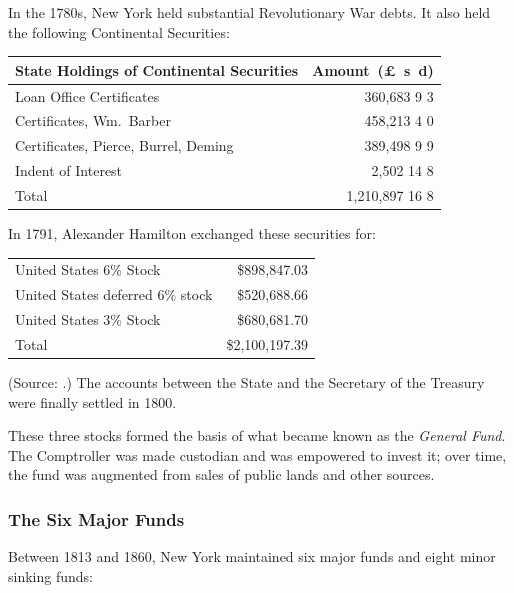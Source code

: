 \documentclass[11pt]{article}
\newcommand{\STRUT}{\rule{0in}{3ex}}
\begin{document}
In the 1780s, New York held substantial Revolutionary War debts.  It also
held the following Continental Securities:

\begin{center}
\begin{tabular}{lr}
State Holdings of Continental Securities & Amount~(£~s~d) \\
\hline
Loan Office Certificates             & 360,683 9 3\STRUT\\
Certificates, Wm.~Barber            & 458,213 4 0\\
Certificates, Pierce, Burrel, Deming & 389,498 9 9\\
Indent of Interest                   & 2,502 14 8 \\
\hline
Total & 1,210,897 16 8\STRUT
\end{tabular}
\end{center}

In 1791, Alexander Hamilton exchanged these securities for:
\begin{center}
\begin{tabular}{lr}
United States 6\% Stock          & \$898,847.03 \\
United States deferred 6\% stock & \$520,688.66 \\
United States 3\% Stock          & \$680,681.70 \\
\hline
Total                            & \$2,100,197.39
\end{tabular}
\end{center}
(Source: \citet[pp.~255--6]{Sowers_1914}.)  The accounts between the State and
the Secretary of the Treasury were finally settled in 1800.

These three stocks formed the basis of what became known as the \textit{General
Fund}.  The Comptroller was made custodian and was empowered to invest it;
over time, the fund was augmented from sales of public lands and other sources.

\subsubsection{The Six Major Funds}

Between 1813 and 1860, New York maintained six major funds and eight minor
sinking funds:
\end{document}

